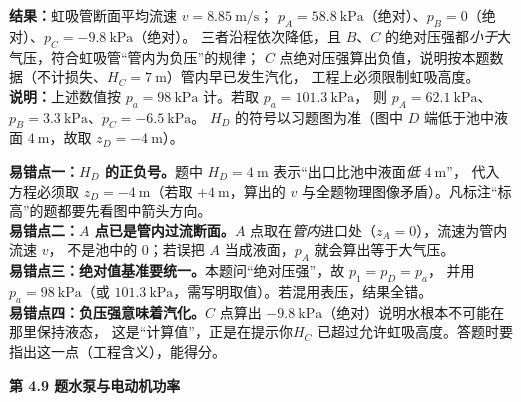 \begin{jie}
\textbf{结果：}虹吸管断面平均流速 $v=8.85\ \mathrm{m/s}$；
$p_A=58.8\ \mathrm{kPa}$（绝对）、$p_B=0$（绝对）、$p_C=-9.8\ \mathrm{kPa}$（绝对）。
三者沿程依次降低，且 $B$、$C$ 的绝对压强都\emph{小于}大气压，符合虹吸管“管内为负压”的规律；
$C$ 点绝对压强算出负值，说明按本题数据（不计损失、$H_C=7\ \mathrm{m}$）管内早已发生汽化，
工程上必须限制虹吸高度。\\
\textbf{说明：}上述数值按 $p_a=98\ \mathrm{kPa}$ 计。若取 $p_a=101.3\ \mathrm{kPa}$，
则 $p_A=62.1\ \mathrm{kPa}$、$p_B=3.3\ \mathrm{kPa}$、$p_C=-6.5\ \mathrm{kPa}$。
$H_D$ 的符号以习题图为准（图中 $D$ 端低于池中液面 $4\ \mathrm{m}$，故取 $z_D=-4\ \mathrm{m}$）。
\end{jie}

\begin{yicuo}
\textbf{易错点一：$H_D$ 的正负号。}题中 $H_D=4\ \mathrm{m}$ 表示“出口比池中液面\emph{低} $4\ \mathrm{m}$”，
代入方程必须取 $z_D=-4\ \mathrm{m}$（若取 $+4\ \mathrm{m}$，算出的 $v$ 与全题物理图像矛盾）。凡标注“标高”的题都要先看图中箭头方向。\\
\textbf{易错点二：$A$ 点已是管内过流断面。}$A$ 点取在\emph{管内}进口处（$z_A=0$），流速为管内流速 $v$，
不是池中的 $0$；若误把 $A$ 当成液面，$p_A$ 就会算出等于大气压。\\
\textbf{易错点三：绝对值基准要统一。}本题问“绝对压强”，故 $p_1=p_D=p_a$，
并用 $p_a=98\ \mathrm{kPa}$（或 $101.3\ \mathrm{kPa}$，需写明取值）。若混用表压，结果全错。\\
\textbf{易错点四：负压强意味着汽化。}$C$ 点算出 $-9.8\ \mathrm{kPa}$（绝对）说明水根本不可能在那里保持液态，
这是“计算值”，正是在提示你$H_C$ 已超过允许虹吸高度。答题时要指出这一点（工程含义），能得分。
\end{yicuo}

\noindent\textbf{第 4.9 题\quad 水泵与电动机功率}

